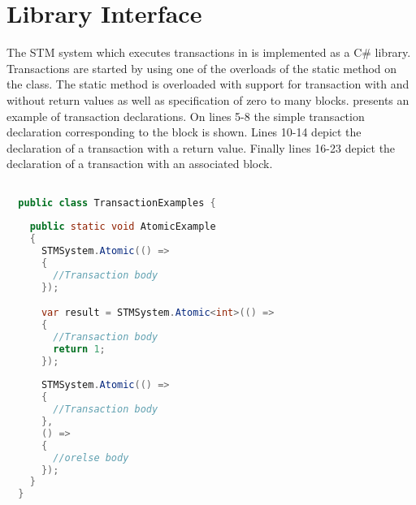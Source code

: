 %
%


\section{Library Interface} 
\label{sec:stm_library_interface}
The \ac{STM} system which executes transactions in \stmnamesp is implemented as a C\# library. Transactions are started by using one of the overloads of the static  method on the  class. The static method  is overloaded with support for transaction with and without return values as well as specification of zero to many  blocks.  presents an example of transaction declarations. On lines 5-8 the simple transaction declaration corresponding to the  block is shown. Lines 10-14 depict the declaration of a transaction with a return value. Finally lines 16-23 depict the declaration of a transaction with an associated  block. 

\begin{lstlisting}[label=lst:library_atomic,
  caption={Library Transaction Declaration},
  language=Java,  
  showspaces=false,
  showtabs=false,
  breaklines=true,
  showstringspaces=false,
  breakatwhitespace=true,
  commentstyle=\color{greencomments},
  keywordstyle=\color{bluekeywords},
  stringstyle=\color{redstrings},
  morekeywords={atomic, retry, orElse, var, get, set}]  % Start your code-block

  public class TransactionExamples {
    
    public static void AtomicExample
    {
      STMSystem.Atomic(() =>
      {
        //Transaction body
      });

      var result = STMSystem.Atomic<int>(() =>
      {
        //Transaction body
        return 1;
      });
      
      STMSystem.Atomic(() =>
      {
        //Transaction body
      },
      () =>
      {
        //orelse body
      });
    }
  }
\end{lstlisting}

